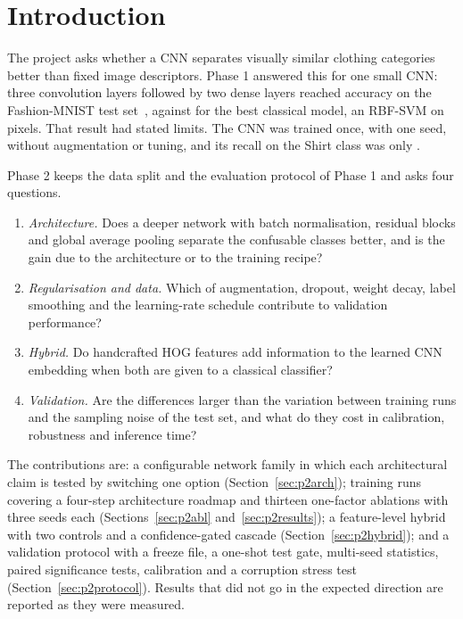 \section{Introduction}
\label{sec:p2intro}
The project asks whether a CNN separates visually similar clothing categories better than fixed image
descriptors. Phase 1 answered this for one small CNN: three convolution layers followed by two dense layers reached
\PhaseOneCnnAcc{} accuracy on the Fashion-MNIST test set~\cite{xiao2017fashion}, against \PhaseOneSvmAcc{} for the
best classical model, an RBF-SVM on pixels. That result had stated limits. The CNN was trained once, with one
seed, without augmentation or tuning, and its recall on the Shirt class was only \PhaseOneShirt.

Phase 2 keeps the data split and the evaluation protocol of Phase 1 and asks four questions.
\begin{enumerate}
\item \emph{Architecture.} Does a deeper network with batch normalisation, residual blocks and global average
pooling separate the confusable classes better, and is the gain due to the architecture or to the training recipe?
\item \emph{Regularisation and data.} Which of augmentation, dropout, weight decay, label smoothing and the
learning-rate schedule contribute to validation performance?
\item \emph{Hybrid.} Do handcrafted HOG features add information to the learned CNN embedding when both are given
to a classical classifier?
\item \emph{Validation.} Are the differences larger than the variation between training runs and the sampling
noise of the test set, and what do they cost in calibration, robustness and inference time?
\end{enumerate}

The contributions are: a configurable network family in which each architectural claim is tested by switching one
option (Section~\ref{sec:p2arch}); \NRuns{} training runs covering a four-step architecture roadmap and thirteen
one-factor ablations with three seeds each (Sections~\ref{sec:p2abl} and~\ref{sec:p2results}); a feature-level
hybrid with two controls and a confidence-gated cascade (Section~\ref{sec:p2hybrid}); and a validation protocol
with a freeze file, a one-shot test gate, multi-seed statistics, paired significance tests, calibration and a
corruption stress test (Section~\ref{sec:p2protocol}). Results that did not go in the expected direction are
reported as they were measured.
